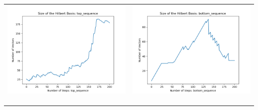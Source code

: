 \documentclass[10pt]{article}
\begin{document}
\begin{tabular}{c|c}
\begin{minipage}{.45\textwidth}
\includegraphics[width=\textwidth]{"DATA/5d/5 generators 2 bound F/top_sequence SIZE"}
\end{minipage} &
\begin{minipage}{.45\textwidth}
\includegraphics[width=\textwidth]{"DATA/5d/5 generators 2 bound F bottomup/bottom_sequence SIZE"}
\end{minipage} \\ \\
\hline \\\begin{minipage}{.45\textwidth}

\end{minipage}
\end{tabular}
\end{document}
